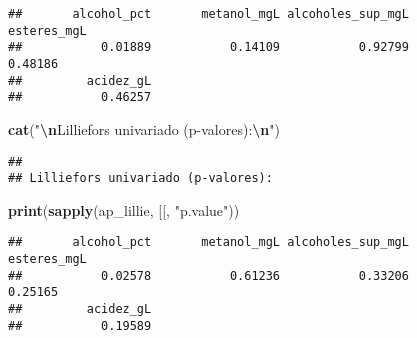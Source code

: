 \documentclass[
]{article}
\newenvironment{Shaded}{\begin{snugshade}}{\end{snugshade}}
\newcommand{\AttributeTok}[1]{\textcolor[rgb]{0.13,0.29,0.53}{#1}}
\newcommand{\CommentTok}[1]{\textcolor[rgb]{0.56,0.35,0.01}{\textit{#1}}}
\newcommand{\ConstantTok}[1]{\textcolor[rgb]{0.56,0.35,0.01}{#1}}
\newcommand{\ControlFlowTok}[1]{\textcolor[rgb]{0.13,0.29,0.53}{\textbf{#1}}}
\newcommand{\FunctionTok}[1]{\textcolor[rgb]{0.13,0.29,0.53}{\textbf{#1}}}
\newcommand{\NormalTok}[1]{#1}
\newcommand{\OtherTok}[1]{\textcolor[rgb]{0.56,0.35,0.01}{#1}}
\newcommand{\SpecialCharTok}[1]{\textcolor[rgb]{0.81,0.36,0.00}{\textbf{#1}}}
\newcommand{\StringTok}[1]{\textcolor[rgb]{0.31,0.60,0.02}{#1}}
\begin{document}
\begin{verbatim}
##       alcohol_pct       metanol_mgL alcoholes_sup_mgL       esteres_mgL 
##           0.01889           0.14109           0.92799           0.48186 
##         acidez_gL 
##           0.46257
\end{verbatim}

\begin{Shaded}
\begin{Highlighting}[]
\FunctionTok{cat}\NormalTok{(}\StringTok{"}\SpecialCharTok{\textbackslash{}n}\StringTok{Lilliefors univariado (p{-}valores):}\SpecialCharTok{\textbackslash{}n}\StringTok{"}\NormalTok{)}
\end{Highlighting}
\end{Shaded}

\begin{verbatim}
## 
## Lilliefors univariado (p-valores):
\end{verbatim}

\begin{Shaded}
\begin{Highlighting}[]
\FunctionTok{print}\NormalTok{(}\FunctionTok{sapply}\NormalTok{(ap\_lillie, }\StringTok{\textasciigrave{}}\AttributeTok{[[}\StringTok{\textasciigrave{}}\NormalTok{, }\StringTok{"p.value"}\NormalTok{))}
\end{Highlighting}
\end{Shaded}

\begin{verbatim}
##       alcohol_pct       metanol_mgL alcoholes_sup_mgL       esteres_mgL 
##           0.02578           0.61236           0.33206           0.25165 
##         acidez_gL 
##           0.19589
\end{verbatim}

\begin{Shaded}
\end{Shaded}
\end{document}
